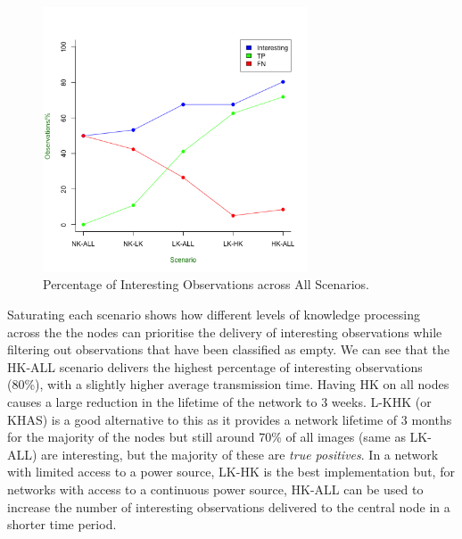 	\begin{figure}[h]
	\centering
	\includegraphics[width=0.70\textwidth]{Chap7/figures/saturated/int_percent}
	\caption{Percentage of Interesting Observations across All Scenarios.}
	\label{fig:sat:int:percent}
	\end{figure}

Saturating each scenario shows how different levels of knowledge processing across the the nodes can prioritise the delivery of interesting observations while filtering out observations that have been classified as empty. We can see that the HK-ALL scenario delivers the highest percentage of interesting observations (80\%), with a slightly higher average transmission time. Having HK on all nodes causes a large reduction in the lifetime of the network to 3 weeks. L-KHK (or KHAS) is a good alternative to this as it provides a network lifetime of 3 months for the majority of the nodes but still around 70\% of all images (same as LK-ALL) are interesting, but the majority of these are \textit{true positives}. In a network with limited access to a power source, LK-HK is the best implementation but, for networks with access to a continuous power source, HK-ALL can be used to increase the number of interesting observations delivered to the central node in a shorter time period.



